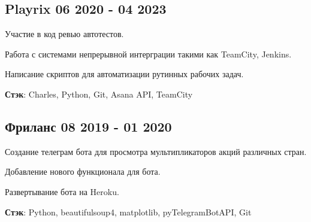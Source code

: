 \documentclass[a4paper,12pt]{article}
\begin{document}


\subsection{{Playrix }\hfill 06 2020 - 04 2023}

\begin{zitemize}
\item Участие в код ревью автотестов.
\item Работа с системами непрерывной интерграции такими как TeamCity, Jenkins.
\item Написание скриптов для автоматизации рутинных рабочих задач.
\end{zitemize}

\textbf {Стэк}: Charles, Python, Git, Asana API, TeamCity



\vspace*{8pt}

\subsection{{Фриланс }\hfill 08 2019 - 01 2020}

\begin{zitemize}
\item Создание телеграм бота для просмотра мультипликаторов акций различных стран.
\item Добавление нового функционала для бота.
\item Развертывание бота на Heroku.
\end{zitemize}

\textbf {Стэк}: Python, beautifulsoup4, matplotlib, pyTelegramBotAPI, Git
\end{document}
